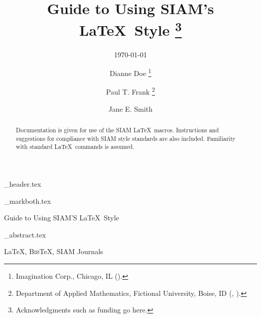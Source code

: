 \documentclass[]{siamart}
\theoremstyle{nonumberplain}
\theoremstyle{plain}
\newcommand{\BibTeX}{{\scshape Bib}\TeX\xspace}
\begin{document}
\begin{tcbverbatimwrite}{\jobname_header.tex}
\title{Guide to Using SIAM's \LaTeX\ Style%
  \thanks{Acknowledgments such as funding go here.}}

\subtitle{\today} 

\author{Dianne Doe%
  \thanks{Imagination Corp., Chicago, IL ().}%
  \and
  Paul T. Frank%
  \thanks{Department of Applied Mathematics, Fictional University, Boise, ID
    (, ).}
  \and
  Jane E. Smith%
  \footnotemark[3]
}

\maketitle

\end{tcbverbatimwrite}


\begin{tcbverbatimwrite}{\jobname_markboth.tex}
\pagestyle{myheadings}
\thispagestyle{plain}
%
{Guide to Using  SIAM'S \LaTeX\ Style}
\end{tcbverbatimwrite}




\begin{tcbverbatimwrite}{\jobname_abstract.tex}
\begin{abstract}
  Documentation is given for use of the SIAM \LaTeX\ macros.
  Instructions and suggestions for compliance with SIAM style
  standards are also included. Familiarity with standard \LaTeX\
  commands is assumed.
\end{abstract}

\begin{keywords}
  \LaTeX, \BibTeX, SIAM Journals 
\end{keywords}

\begin{AMS}
\end{AMS}
\end{tcbverbatimwrite}

\end{document}
